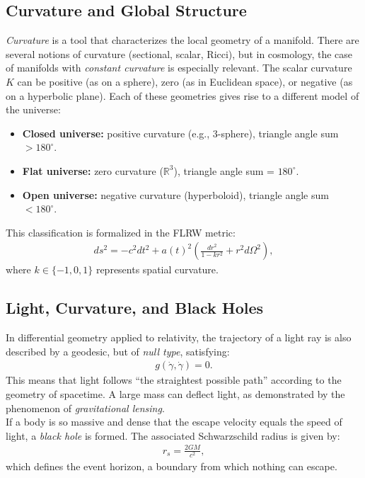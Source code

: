 \documentclass{aleph-revista}
\begin{document}
\subsection*{Curvature and Global Structure}
\textit{Curvature} is a tool that characterizes the local geometry of a manifold. There are several notions of curvature (sectional, scalar, Ricci), but in cosmology, the case of manifolds with \textit{constant curvature} is especially relevant. The scalar curvature \(K\) can be positive (as on a sphere), zero (as in Euclidean space), or negative (as on a hyperbolic plane). Each of these geometries gives rise to a different model of the universe:
\begin{itemize}
  \item \textbf{Closed universe:} positive curvature (e.g., 3-sphere), triangle angle sum $> 180^\circ$.
  \item \textbf{Flat universe:} zero curvature ($\mathbb{R}^3$), triangle angle sum = $180^\circ$.
  \item \textbf{Open universe:} negative curvature (hyperboloid), triangle angle sum $< 180^\circ$.
\end{itemize}
This classification is formalized in the FLRW metric:
\begin{align*}
ds^2 = -c^2 dt^2 + a(t)^2 \left( \frac{dr^2}{1 - kr^2} + r^2 d\Omega^2 \right),
\end{align*}
where $k \in \{-1, 0, 1\}$ represents spatial curvature.
\subsection*{Light, Curvature, and Black Holes}
In differential geometry applied to relativity, the trajectory of a light ray is also described by a geodesic, but of \textit{null type}, satisfying:
\begin{align*}
g(\dot{\gamma}, \dot{\gamma}) = 0.
\end{align*}
This means that light follows “the straightest possible path” according to the geometry of spacetime. A large mass can deflect light, as demonstrated by the phenomenon of \textit{gravitational lensing}.\\
If a body is so massive and dense that the escape velocity equals the speed of light, a \textit{black hole} is formed. The associated Schwarzschild radius is given by:
\begin{align*}
r_s = \frac{2GM}{c^2},
\end{align*}
which defines the event horizon, a boundary from which nothing can escape.
\end{document}
